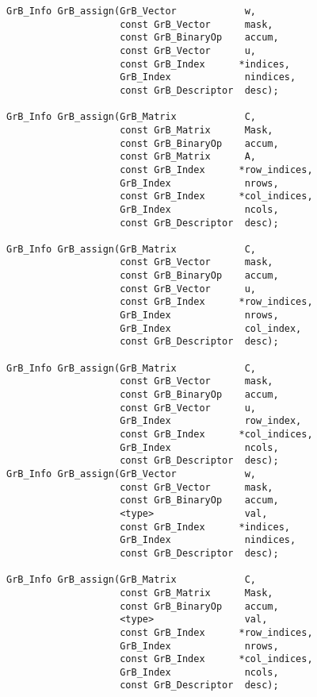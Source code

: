 \documentclass[11pt]{article}
\begin{document}
\begin{verbatim}
GrB_Info GrB_assign(GrB_Vector            w,
                    const GrB_Vector      mask,
                    const GrB_BinaryOp    accum,
                    const GrB_Vector      u,
                    const GrB_Index      *indices,
                    GrB_Index             nindices,
                    const GrB_Descriptor  desc);

GrB_Info GrB_assign(GrB_Matrix            C,
                    const GrB_Matrix      Mask,
                    const GrB_BinaryOp    accum,
                    const GrB_Matrix      A,
                    const GrB_Index      *row_indices,
                    GrB_Index             nrows,
                    const GrB_Index      *col_indices,
                    GrB_Index             ncols,
                    const GrB_Descriptor  desc);

GrB_Info GrB_assign(GrB_Matrix            C,
                    const GrB_Vector      mask,
                    const GrB_BinaryOp    accum,
                    const GrB_Vector      u,
                    const GrB_Index      *row_indices,
                    GrB_Index             nrows,
                    GrB_Index             col_index,
                    const GrB_Descriptor  desc);

GrB_Info GrB_assign(GrB_Matrix            C,
                    const GrB_Vector      mask,
                    const GrB_BinaryOp    accum,
                    const GrB_Vector      u,
                    GrB_Index             row_index,
                    const GrB_Index      *col_indices,
                    GrB_Index             ncols,
                    const GrB_Descriptor  desc);
GrB_Info GrB_assign(GrB_Vector            w,
                    const GrB_Vector      mask,
                    const GrB_BinaryOp    accum,
                    <type>                val,
                    const GrB_Index      *indices,
                    GrB_Index             nindices,
                    const GrB_Descriptor  desc);

GrB_Info GrB_assign(GrB_Matrix            C,
                    const GrB_Matrix      Mask,
                    const GrB_BinaryOp    accum,
                    <type>                val,
                    const GrB_Index      *row_indices,
                    GrB_Index             nrows,
                    const GrB_Index      *col_indices,
                    GrB_Index             ncols,
                    const GrB_Descriptor  desc);


\end{verbatim}
\end{document}
